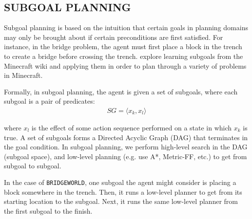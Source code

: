\documentclass[]{article}
\newcommand{\stnote}[1]{\textcolor{Blue}{\textbf{ST: #1}}}
\begin{document}



\subsection{SUBGOAL PLANNING}
\label{sec:subgoals}

Subgoal planning is based on the intuition that certain goals in
planning domains may only be brought about if certain preconditions
are first satisfied. For instance, in the bridge problem, the agent must
first place a block in the trench to create a bridge before crossing
the trench.  \citep{branavan12a} explore learning subgoals from the
Minecraft wiki and applying them in order to plan through a variety of
problems in Minecraft.

Formally, in subgoal planning, the agent is given a set of subgoals, where each subgoal is a pair of predicates:
\begin{align}
SG = \langle x_k, x_l \rangle
\end{align}


where $x_l$ is the effect of some action sequence performed on 
a state in which $x_k$ is true. A set of subgoals forms a Directed Acyclic Graph (DAG)
that terminates in the goal condition. In subgoal planning, we perform high-level search
in the DAG (subgoal space), and low-level planning (e.g. use A*, Metric-FF, etc.)  to get from subgoal to subgoal. 

In the case of \texttt{BRIDGEWORLD}, one subgoal the agent might consider is placing
a block somewhere in the trench. Then, it runs
a low-level planner to get from its starting location to the subgoal.
Next, it runs the same low-level planner from the first subgoal to the finish.
\end{document}

